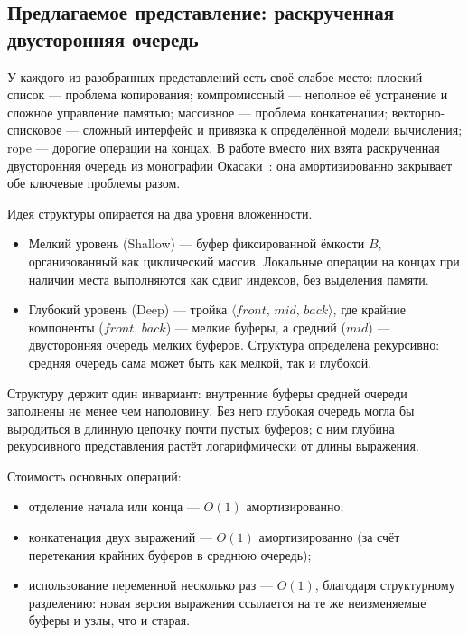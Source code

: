 \subsection{Предлагаемое представление: раскрученная двусторонняя очередь}
\label{sec:bootstrapped-deque}

У каждого из разобранных представлений есть своё слабое место:
плоский список --- проблема копирования; компромиссный --- неполное её
устранение и сложное управление памятью; массивное --- проблема
конкатенации; векторно-списковое --- сложный интерфейс и привязка к
определённой модели вычисления; rope --- дорогие операции на концах.
В работе вместо них взята раскрученная двусторонняя
очередь из монографии
Окасаки~\cite{okasaki_pfds}: она амортизированно закрывает обе
ключевые проблемы разом.

Идея структуры опирается на два уровня вложенности.

\begin{itemize}
  \item Мелкий уровень (Shallow) --- буфер фиксированной
        ёмкости \(B\), организованный как циклический массив. Локальные
        операции на концах при наличии места выполняются как сдвиг
        индексов, без выделения памяти.
  \item Глубокий уровень (Deep) --- тройка \(\langle
        front,\, mid,\, back\rangle\), где крайние компоненты
        (\(front\), \(back\)) --- мелкие буферы, а средний (\(mid\)) ---
        двусторонняя
        очередь мелких буферов. Структура определена рекурсивно: средняя
        очередь сама может быть как мелкой, так и глубокой.
\end{itemize}

Структуру держит один инвариант: внутренние буферы средней очереди заполнены не менее
чем наполовину. Без него глубокая очередь могла бы выродиться в длинную
цепочку почти пустых буферов; с ним глубина рекурсивного представления
растёт логарифмически от длины выражения.

Стоимость основных операций:

\begin{itemize}
  \item отделение начала или конца --- \(O(1)\) амортизированно;
  \item конкатенация двух выражений --- \(O(1)\) амортизированно (за счёт
        перетекания крайних буферов в среднюю очередь);
  \item использование переменной несколько раз --- \(O(1)\), благодаря
        структурному разделению: новая версия выражения
        ссылается на те же неизменяемые буферы и узлы, что и старая.
\end{itemize}

